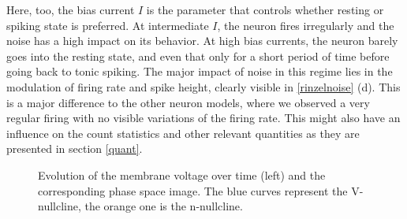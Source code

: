 \documentclass[12pt,a4paper]{article}
\begin{document}
Here, too, the bias current $I$ is the parameter that controls whether resting or spiking state is preferred. At intermediate $I$, the neuron fires irregularly and the noise has a high impact on its behavior. At high bias currents, the neuron barely goes into the resting state, and even that only for a short period of time before going back to tonic spiking. The major impact of noise in this regime lies in the modulation of firing rate and spike height, clearly visible in \ref{rinzelnoise} (d). This is a major difference to the other neuron models, where we observed a very regular firing with no visible variations of the firing rate. This might also have an influence on the count statistics and other relevant quantities as they are presented in section \ref{quant}.

\begin{figure}[H]
	\hspace*{-0.5cm}
	
	\caption{Evolution of the membrane voltage over time (left) and the corresponding phase space image. The blue curves represent the V-nullcline, the orange one is the n-nullcline. }
	\label{ppcomprinzel}
\end{figure}
\end{document}
